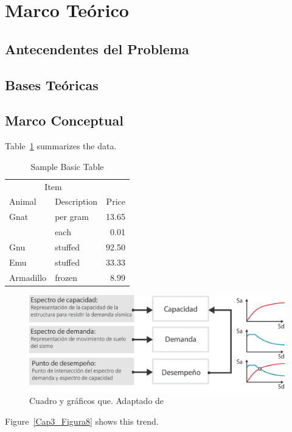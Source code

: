 \section{Marco Teórico}

\subsection{Antecendentes del Problema}

\lipsum[15]

\lipsum[15]

\subsection{Bases Teóricas}

\lipsum[2]

\subsection{Marco Conceptual}

Table~\ref{tab:BasicTable} summarizes the data. \lipsum[15]

\begin{table}
  \caption{Sample Basic Table}
  \label{tab:BasicTable}
  \begin{tabular}{@{}llr@{}}         \toprule
  \multicolumn{2}{c}{Item}        \\ \cmidrule(r){1-2}
  Animal    & Description & Price \\ \midrule
  Gnat      & per gram    & 13.65 \\
            & each        &  0.01 \\
  Gnu       & stuffed     & 92.50 \\
  Emu       & stuffed     & 33.33 \\
  Armadillo & frozen      &  8.99 \\ \bottomrule
  \end{tabular}
\end{table}

\begin{figure}[!ht]
	\centering
  \includegraphics[scale=0.36]{E_IMAGENES/3_Capitulo3/Cap3_Imagen70.png}
	\caption{\centering\footnotesize Cuadro y gráficos que. Adaptado de \cite{deWaal2009}}
	\label{Cap3_Figura2}
\end{figure}

Figure~\ref{Cap3_Figura8} shows this trend. \lipsum[16]